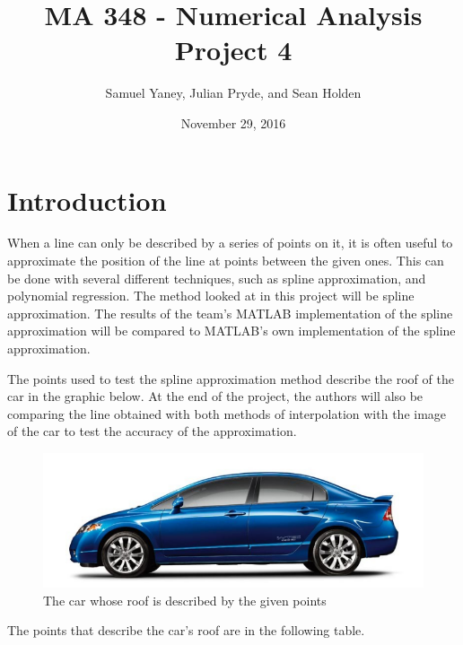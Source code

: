 \documentclass[12pt, letterpaper]{article} %
\begin{document}
\title{MA 348 - Numerical Analysis \\ Project 4}
\author{Samuel Yaney, Julian Pryde, and Sean Holden}
\date{November 29, 2016}
\maketitle

\section{Introduction}

When a line can only be described by a series of points on it, it is often useful to approximate the position of the line at points between the given ones. This can be done with several different techniques, such as spline approximation, and polynomial regression. The method looked at in this project will be spline approximation. The results of the team's MATLAB implementation of the spline approximation will be compared to MATLAB's own implementation of the spline approximation.

The points used to test the spline approximation method describe the roof of the car in the graphic below. At the end of the project, the authors will also be comparing the line obtained with both methods of interpolation with the image of the car to test the accuracy of the approximation.

\begin{figure}
	\centering	
		\includegraphics[scale=0.5]{Car.png}
		\caption{The car whose roof is described by the given points}
\end{figure}

The points that describe the car's roof are in the following table.
\end{document}
